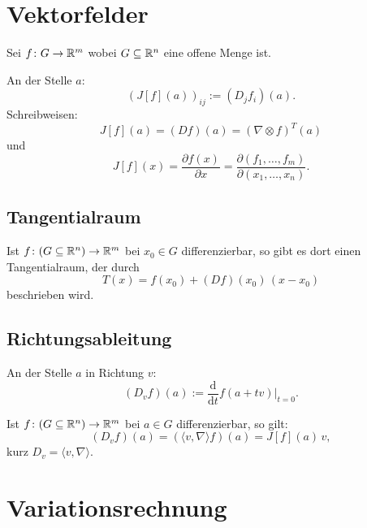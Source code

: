 \section{Vektorfelder}
Sei $f\colon G\to\mathbb R^m$ wobei $G\subseteq\mathbb R^n$ eine offene Menge ist.
\begin{definition}\mbox{}\newline
An der Stelle $a$:
\begin{equation}
(J[f](a))_{ij} := (D_j f_i)(a).
\end{equation}
Schreibweisen:
\begin{equation}
J[f](a) = (Df)(a) = (\nabla\otimes f)^T(a)
\end{equation}
und
\begin{equation}
J[f](x) = \frac{\partial f(x)}{\partial x}
= \frac{\partial(f_1,\ldots,f_m)}{\partial(x_1,\ldots,x_n)}.
\end{equation}
\end{definition}

\subsection{Tangentialraum}
Ist $f\colon (G\subseteq\mathbb R^n)\to\mathbb R^m$ bei $x_0\in G$ differenzierbar,
so gibt es dort einen Tangentialraum, der durch
\begin{equation}
T(x) = f(x_0)+(Df)(x_0)\,(x-x_0)
\end{equation}
beschrieben wird.

\subsection{Richtungsableitung}
\begin{definition}[Richtungsableitung]\mbox{}\newline
An der Stelle $a$ in Richtung $v$:
\begin{equation}
(D_v f)(a) := \frac{\mathrm d}{\mathrm dt}f(a+tv)\Big|_{t=0}.
\end{equation}
\end{definition}
\noindent
Ist $f\colon (G\subseteq\mathbb R^n)\to\mathbb R^m$ bei $a\in G$ differenzierbar,
so gilt:%
\begin{equation}
(D_v f)(a) = (\langle v,\nabla\rangle f)(a) = J[f](a)\,v,
\end{equation}
kurz $D_v = \langle v,\nabla\rangle$.

\section{Variationsrechnung}

